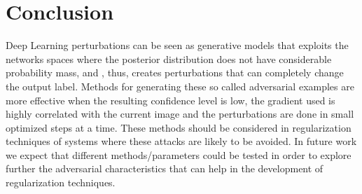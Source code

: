 \documentclass[10pt,journal,compsoc]{IEEEtran}
\begin{document}
\section{Conclusion}
Deep Learning perturbations can be seen as generative models that exploits the networks spaces where the posterior distribution does not have considerable probability mass, and , thus, creates perturbations that can completely change the output label. Methods for generating these so called adversarial examples are  more effective when the resulting confidence level is low, the gradient used is highly correlated with the current image and the perturbations are done in small optimized steps at a time. These methods should be considered in regularization techniques of systems where these attacks are likely to be avoided. In future work we expect that different methods/parameters could be tested in order to explore further the adversarial characteristics that can help in the development of regularization techniques.


\ifCLASSOPTIONcaptionsoff
  \newpage
\fi

\pagebreak



\end{document}
